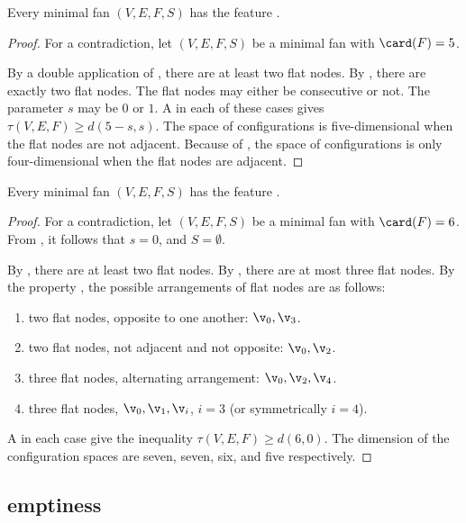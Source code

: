 \begin{lemma}[]\label{lemma:pentagon-free}
Every minimal fan $(V,E,F,S)$ has the feature .
\end{lemma}

\begin{proof}
For a contradiction, let $(V,E,F,S)$ be a minimal fan with $\card(F)=5$.  

By a double application of , there are at least two
flat nodes.  By , there are exactly two flat nodes.
The flat nodes may either be consecutive or not.  The parameter $s$
may be $0$ or $1$.  A  in each of
these cases gives $\tau(V,E,F)\ge d(5-s,s)$.  The space of
configurations is five-dimensional when the flat nodes are not
adjacent.  Because of , the space of
configurations is only four-dimensional when the flat nodes are
adjacent.
\end{proof}

\begin{lemma}[]\label{lemma:hexagon-free}
Every minimal fan $(V,E,F,S)$ has the feature .
\end{lemma}

\begin{proof}
For a contradiction, let $(V,E,F,S)$ be a minimal fan with $\card(F)=6$.
From , it follows that $s=0$, and $S=\emptyset$.

By , there are at least two flat nodes.  By
, there are at most three flat nodes.  By the
property , the possible arrangements of flat
nodes are as follows:
\begin{enumerate}\wasitemize 
\item two flat nodes, opposite to one another: $\v_0,\v_3$.
\item two flat nodes, not adjacent and not opposite: $\v_0,\v_2$.
\item three flat nodes, alternating arrangement: $\v_0,\v_2,\v_4$.
\item three flat nodes, $\v_0,\v_1,\v_i$, $i=3$ (or symmetrically $i=4$).
\end{enumerate}\wasitemize 
A  in each case give the inequality
$\tau(V,E,F)\ge d(6,0)$.  The dimension of the configuration spaces
are seven, seven, six, and five respectively.
\end{proof}  


\subsection{emptiness}


